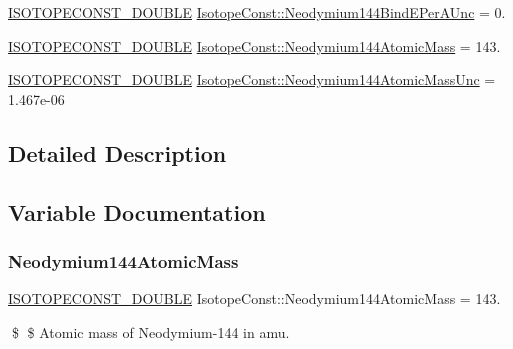 \begin{DoxyCompactItemize}
\mbox{\hyperlink{group___isotope_const-_macros_ga8f45a7272ce02c0b4c65c44636ed719a}{I\+S\+O\+T\+O\+P\+E\+C\+O\+N\+S\+T\+\_\+\+D\+O\+U\+B\+LE}} \mbox{\hyperlink{group___isotope_const-_neodymium-_nd144_ga3d5a92a30f424cbc10b4647c0eaf20bc}{Isotope\+Const\+::\+Neodymium144\+Bind\+E\+Per\+A\+Unc}} = 0.
\item 
\mbox{\hyperlink{group___isotope_const-_macros_ga8f45a7272ce02c0b4c65c44636ed719a}{I\+S\+O\+T\+O\+P\+E\+C\+O\+N\+S\+T\+\_\+\+D\+O\+U\+B\+LE}} \mbox{\hyperlink{group___isotope_const-_neodymium-_nd144_ga2e40e7c5b7b6bcad8babef816495e753}{Isotope\+Const\+::\+Neodymium144\+Atomic\+Mass}} = 143.
\item 
\mbox{\hyperlink{group___isotope_const-_macros_ga8f45a7272ce02c0b4c65c44636ed719a}{I\+S\+O\+T\+O\+P\+E\+C\+O\+N\+S\+T\+\_\+\+D\+O\+U\+B\+LE}} \mbox{\hyperlink{group___isotope_const-_neodymium-_nd144_ga0089c12b6bea5229b538f26dd2e9ee8f}{Isotope\+Const\+::\+Neodymium144\+Atomic\+Mass\+Unc}} = 1.\+467e-\/06
\end{DoxyCompactItemize}


\subsection{Detailed Description}


\subsection{Variable Documentation}
\mbox{\label{group___isotope_const-_neodymium-_nd144_ga2e40e7c5b7b6bcad8babef816495e753}} 
\subsubsection{\texorpdfstring{Neodymium144\+Atomic\+Mass}{Neodymium144AtomicMass}}
{\footnotesize\ttfamily \mbox{\hyperlink{group___isotope_const-_macros_ga8f45a7272ce02c0b4c65c44636ed719a}{I\+S\+O\+T\+O\+P\+E\+C\+O\+N\+S\+T\+\_\+\+D\+O\+U\+B\+LE}} Isotope\+Const\+::\+Neodymium144\+Atomic\+Mass = 143.}

\$ \$ Atomic mass of Neodymium-\/144 in amu. \mbox{\label{group___isotope_const-_neodymium-_nd144_ga0089c12b6bea5229b538f26dd2e9ee8f}} 

